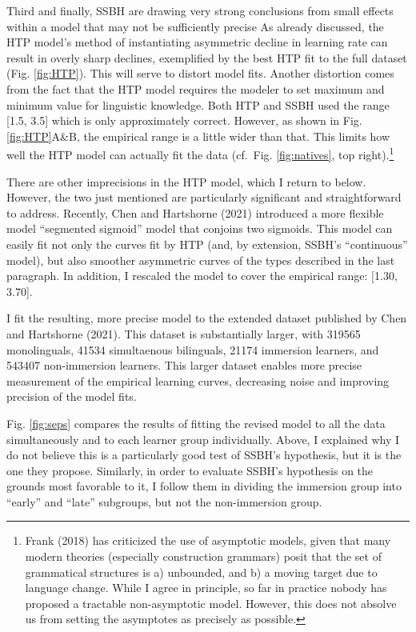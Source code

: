 \documentclass[
  english,
  doc,floatsintext]{apa6}
\begin{document}
Third and finally, SSBH are drawing very strong conclusions from small effects within a model that may not be sufficiently precise As already discussed, the HTP model's method of instantiating asymmetric decline in learning rate can result in overly sharp declines, exemplified by the best HTP fit to the full dataset (Fig. \ref{fig:HTP}). This will serve to distort model fits. Another distortion comes from the fact that the HTP model requires the modeler to set maximum and minimum value for linguistic knowledge. Both HTP and SSBH used the range {[}1.5, 3.5{]} which is only approximately correct. However, as shown in Fig. \ref{fig:HTP}A\&B, the empirical range is a little wider than that. This limits how well the HTP model can actually fit the data (cf.~Fig. \ref{fig:natives}, top right).\footnote{Frank (2018) has criticized the use of asymptotic models, given that many modern theories (especially construction grammars) posit that the set of grammatical structures is a) unbounded, and b) a moving target due to language change. While I agree in principle, so far in practice nobody has proposed a tractable non-asymptotic model. However, this does not absolve us from setting the asymptotes as precisely as possible.}

There are other imprecisions in the HTP model, which I return to below. However, the two just mentioned are particularly significant and straightforward to address. Recently, Chen and Hartshorne (2021) introduced a more flexible model ``segmented sigmoid'' model that conjoins two sigmoids. This model can easily fit not only the curves fit by HTP (and, by extension, SSBH's ``continuous'' model), but also smoother asymmetric curves of the types described in the last paragraph. In addition, I rescaled the model to cover the empirical range: {[}1.30, 3.70{]}.

I fit the resulting, more precise model to the extended dataset published by Chen and Hartshorne (2021). This dataset is substantially larger, with 319565 monolinguals, 41534 simultaenous bilinguals, 21174 immersion learners, and 543407 non-immersion learners. This larger dataset enables more precise measurement of the empirical learning curves, decreasing noise and improving precision of the model fits.

Fig. \ref{fig:seps} compares the results of fitting the revised model to all the data simultaneously and to each learner group individually. Above, I explained why I do not believe this is a particularly good test of SSBH's hypothesis, but it is the one they propose. Similarly, in order to evaluate SSBH's hypothesis on the grounds most favorable to it, I follow them in dividing the immersion group into ``early'' and ``late'' subgroups, but not the non-immersion group.
\end{document}
